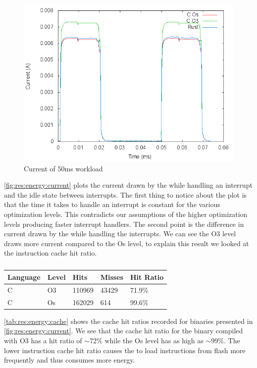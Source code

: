 \begin{figure}[H]
  \includegraphics[width=\textwidth]{results/plots/energy/irq/50.png}
  \caption{Current of 50ms workload}
  \label{fig:res:energy:current}
\end{figure}

\autoref{fig:res:energy:current} plots the current drawn by the {\gecko} while handling an interrupt and the idle state between interrupts.
The first thing to notice about the plot is that the time it takes to handle an interrupt is constant for the various optimization levels.
This contradicts our assumptions of the higher optimization levels producing faster interrupt handlers.
The second point is the difference in current drawn by the {\gecko} while handling the interrupts.
We can see the O3 level draws more current compared to the Os level, to explain this result we looked at the instruction cache hit ratio.

\begin{table}[H]
  \centering
  \begin{tabular}{l | l | l | l | l}
    \textbf{Language} & \textbf{Level} & \textbf{Hits} & \textbf{Misses} & \textbf{Hit Ratio} \\
    \hline
    C & O3 & 110969 & 43429 & 71.9\% \\
    C & Os & 162029 & 614 & 99.6\% \\
    \hline
  \end{tabular}
  \caption{}
  \label{tab:res:energy:cache}
\end{table}

\autoref{tab:res:energy:cache} shows the cache hit ratios recorded for binaries presented in \autoref{fig:res:energy:current}.
We see that the cache hit ratio for the binary compiled with O3 has a hit ratio of $\sim$72\% while the Os level has as high as $\sim$99\%.
The lower instruction cache hit ratio causes the {\gecko} to load instructions from flash more frequently and thus consumes more energy.
